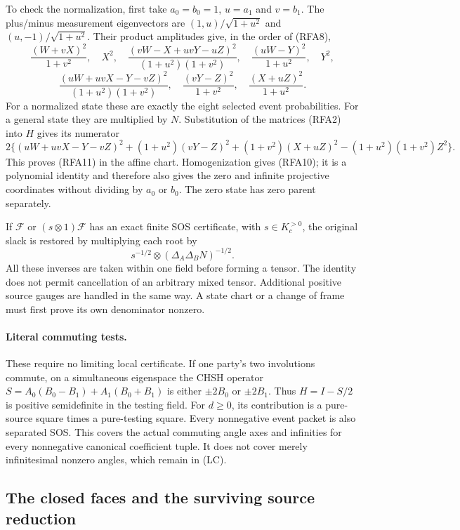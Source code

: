 To check the normalization, first take $a_0=b_0=1$, $u=a_1$ and
$v=b_1$. The plus/minus measurement eigenvectors are
$(1,u)/\sqrt{1+u^2}$ and $(u,-1)/\sqrt{1+u^2}$.
Their product amplitudes give, in the order of (RFA8),
\[
 \frac{(W+vX)^2}{1+v^2},\quad X^2,\quad
 \frac{(vW-X+uvY-uZ)^2}{(1+u^2)(1+v^2)},\quad
 \frac{(uW-Y)^2}{1+u^2},\quad Y^2,
\]
\[
 \frac{(uW+uvX-Y-vZ)^2}{(1+u^2)(1+v^2)},\quad
 \frac{(vY-Z)^2}{1+v^2},\quad
 \frac{(X+uZ)^2}{1+u^2}.
 \tag{RFA12}
\]
For a normalized state these are exactly the eight selected event
probabilities. For a general state they are multiplied by $N$.
Substitution of the matrices (RFA2) into $H$ gives its numerator
\[
 2\{(uW+uvX-Y-vZ)^2+(1+u^2)(vY-Z)^2
       +(1+v^2)(X+uZ)^2-(1+u^2)(1+v^2)Z^2\}.
\]
This proves (RFA11) in the affine chart. Homogenization gives (RFA10);
it is a polynomial identity and therefore also gives the zero and
infinite projective coordinates without dividing by $a_0$ or $b_0$.
The zero state has zero parent separately.

If $\mathcal F$ or $(s\otimes1)\mathcal F$ has an exact finite SOS
certificate, with $s\in K_c^{>0}$, the original slack is restored by
multiplying each root by
\[
 s^{-1/2}\otimes(\Delta_A\Delta_BN)^{-1/2}.
 \tag{RFA13}
\]
All these inverses are taken within one field before forming a tensor.
The identity does not permit cancellation of an arbitrary mixed tensor.
Additional positive source gauges are handled in the same way. A state
chart or a change of frame must first prove its own denominator nonzero.

\paragraph{Literal commuting tests.}
These require no limiting local certificate. If one party's two
involutions commute, on a simultaneous eigenspace the CHSH operator
$S=A_0(B_0-B_1)+A_1(B_0+B_1)$ is either $\pm2B_0$ or $\pm2B_1$.
Thus $H=I-S/2$ is positive semidefinite in the testing field. For
$d\geq0$, its contribution is a pure-source square times a
pure-testing square. Every nonnegative event packet is also separated
SOS. This covers the actual commuting angle axes and infinities for
every nonnegative canonical coefficient tuple. It does not cover merely
infinitesimal nonzero angles, which remain in (LC).

\subsection{The closed faces and the surviving source reduction}

